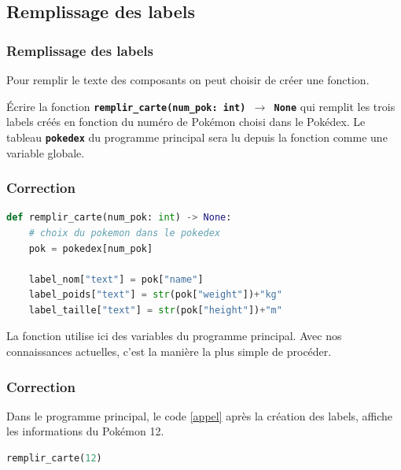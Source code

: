 \documentclass[svgnames,11pt]{beamer}
\begin{document}
\subsection{Remplissage des labels}
\begin{frame}
    \frametitle{Remplissage des labels}

    Pour remplir le texte des composants on peut choisir de créer une fonction.
    \begin{activite}
        Écrire la fonction \textbf{\texttt{remplir\_carte(num\_pok: int) $\rightarrow$ None}} qui remplit les trois labels créés en fonction du numéro de Pokémon choisi dans le Pokédex. Le tableau \textbf{\texttt{pokedex}} du programme principal sera lu depuis la fonction comme une variable globale.
    \end{activite}
\end{frame}
\begin{frame}[fragile]
    \frametitle{Correction}
    \begin{center}
        \begin{lstlisting}[language=Python , basicstyle=\ttfamily\small, xleftmargin=1em, xrightmargin=1em]
def remplir_carte(num_pok: int) -> None:
    # choix du pokemon dans le pokedex
    pok = pokedex[num_pok]

    label_nom["text"] = pok["name"]
    label_poids["text"] = str(pok["weight"])+"kg"
    label_taille["text"] = str(pok["height"])+"m"
\end{lstlisting}
        \label{CODE}
    \end{center}

    \begin{aretenir}[Commentaire]
        La fonction utilise ici des variables du programme principal. Avec nos connaissances actuelles, c'est la manière la plus simple de procéder.
    \end{aretenir}
\end{frame}
\begin{frame}[fragile]
    \frametitle{Correction}

    Dans le programme principal, le code \ref{appel} après la création des labels, affiche les informations du Pokémon 12.

    \begin{center}
        \begin{lstlisting}[language=Python , basicstyle=\ttfamily\small, xleftmargin=1em, xrightmargin=1em]
remplir_carte(12)
\end{lstlisting}
        \label{appel}
    \end{center}

\end{frame}
\end{document}
